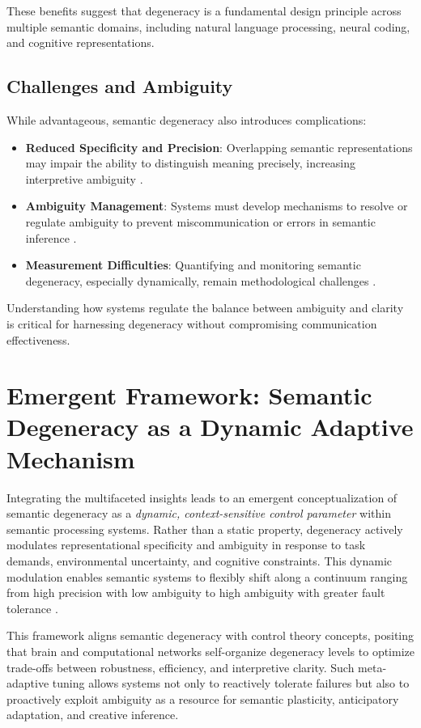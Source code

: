 \documentclass[12pt,a4paper]{article}
\begin{document}
These benefits suggest that degeneracy is a fundamental design principle across multiple semantic domains, including natural language processing, neural coding, and cognitive representations.

\subsection{Challenges and Ambiguity}

While advantageous, semantic degeneracy also introduces complications:

\begin{itemize}
    \item \textbf{Reduced Specificity and Precision}: Overlapping semantic representations may impair the ability to distinguish meaning precisely, increasing interpretive ambiguity \cite{citation_needed}.
    \item \textbf{Ambiguity Management}: Systems must develop mechanisms to resolve or regulate ambiguity to prevent miscommunication or errors in semantic inference \cite{citation_needed}.
    \item \textbf{Measurement Difficulties}: Quantifying and monitoring semantic degeneracy, especially dynamically, remain methodological challenges \cite{citation_needed}.
\end{itemize}

Understanding how systems regulate the balance between ambiguity and clarity is critical for harnessing degeneracy without compromising communication effectiveness.

\section{Emergent Framework: Semantic Degeneracy as a Dynamic Adaptive Mechanism}

Integrating the multifaceted insights leads to an emergent conceptualization of semantic degeneracy as a \textit{dynamic, context-sensitive control parameter} within semantic processing systems. Rather than a static property, degeneracy actively modulates representational specificity and ambiguity in response to task demands, environmental uncertainty, and cognitive constraints. This dynamic modulation enables semantic systems to flexibly shift along a continuum ranging from high precision with low ambiguity to high ambiguity with greater fault tolerance \cite{citation_needed}.

This framework aligns semantic degeneracy with control theory concepts, positing that brain and computational networks self-organize degeneracy levels to optimize trade-offs between robustness, efficiency, and interpretive clarity. Such meta-adaptive tuning allows systems not only to reactively tolerate failures but also to proactively exploit ambiguity as a resource for semantic plasticity, anticipatory adaptation, and creative inference.
\end{document}
